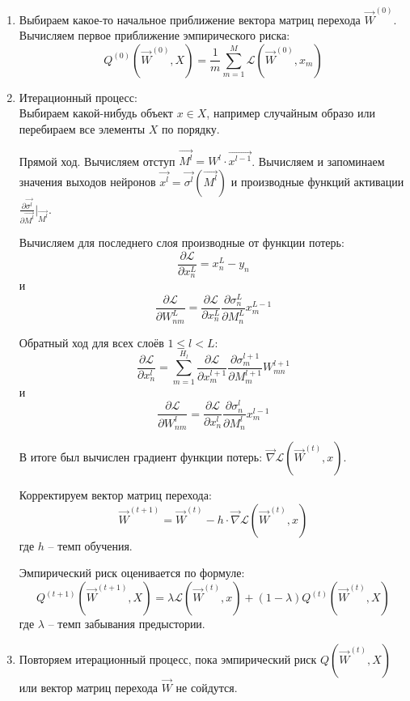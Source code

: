 \begin{enumerate}
	\item Выбираем какое-то начальное приближение вектора матриц перехода $\overrightarrow{W}^{(0)}$. Вычисляем первое приближение эмпирического риска:
	$$
	Q^{(0)}(\overrightarrow{W}^{(0)}, X) = \frac{1}{m} \sum\limits_{m = 1}^{M} \mathcal{L} (\overrightarrow{W}^{(0)}, x_m)
	$$
	
	\item Итерационный процесс: \\
	Выбираем какой-нибудь объект $x \in X$, например случайным образо или перебираем все элементы $X$ по порядку.
	
	Прямой ход. Вычисляем отступ $\overrightarrow{M^l} = W^l \cdot \overrightarrow{x^{l-1}}$.
	Вычисляем и запоминаем значения выходов нейронов $\overrightarrow{x^l} = \overrightarrow{\sigma^l}(\overrightarrow{M^l})$ и производные функций активации $\frac{\partial \overrightarrow{\sigma^l}}{\partial \overrightarrow{M^l}}\Big|_{\overrightarrow{M^l}}$.
	
	Вычисляем для последнего слоя производные от функции потерь:
	$$
	\frac{\partial \mathcal{L}}{\partial x^L_n} = x^L_n - y_n
	$$
	и
	$$
	\frac{\partial \mathcal{L}}{\partial W^L_{nm}} = \frac{\partial \mathcal{L}}{\partial x^L_n} \frac{\partial \sigma^L_n}{\partial M^L_n} x^{L-1}_{m}
	$$
	
	Обратный ход для всех слоёв $1 \le l < L$:
	$$
	\frac{\partial \mathcal{L}}{\partial x^{l}_n} = \sum\limits_{m = 1}^{H_l} \frac{\partial \mathcal{L}}{\partial x^{l+1}_m} \frac{\partial \sigma^{l+1}_m}{\partial M^{l+1}_m} W^{l+1}_{mn}
	$$
	и
	$$
	\frac{\partial \mathcal{L}}{\partial W^{l}_{nm}} = \frac{\partial \mathcal{L}}{\partial x^{l}_n} \frac{\partial \sigma^{l}_n}{\partial M^{l}_n} x^{l-1}_{m}
	$$
	
	В итоге был вычислен градиент функции потерь: $\overrightarrow{\nabla} \mathcal{L} (\overrightarrow{W}^{(t)}, x)$.
	
	Корректируем вектор матриц перехода:
	$$
	\overrightarrow{W}^{(t+1)} = \overrightarrow{W}^{(t)} - h \cdot \overrightarrow{\nabla} \mathcal{L} (\overrightarrow{W}^{(t)}, x)
	$$
	где $h$ -- темп обучения.
	
	Эмпирический риск оценивается по формуле:
	$$
	Q^{(t+1)}(\overrightarrow{W}^{(t+1)}, X) = \lambda \mathcal{L} (\overrightarrow{W}^{(t)}, x) + (1-\lambda)  Q^{(t)}(\overrightarrow{W}^{(t)}, X)
	$$
	где $\lambda$ -- темп забывания предыстории.
	
	\item Повторяем итерационный процесс, пока эмпирический риск $Q(\overrightarrow{W}^{(t)}, X)$ или вектор матриц перехода $\overrightarrow{W}$ не сойдутся.
\end{enumerate}




